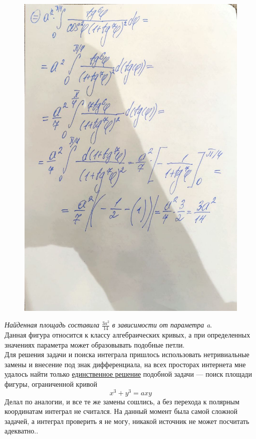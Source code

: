 \documentclass[a4paper,12pt]{article}
\begin{document}
\begin{figure}[H]
    \centering
    \includegraphics[width=0.75\linewidth]{../img/4_2.jpg}
    \caption{}
    \label{fig:part1}
\end{figure}

\emph{Найденная площадь составила} \( \frac{3a^2}{14} \) \emph{в зависимости от параметра a}.\\
Данная фигура относится к классу алгебраических кривых, а при определенных
значениях параметра может образовывать подобные петли.\\
Для решения задачи и поиска интеграла пришлось использовать нетривиальные
замены и внесение под знак дифференциала, на всех просторах интернета
мне удалось найти только \href{https://primat.org/publ/reshennye_zadachi/vychislenie_ploskoj_figury/43-1-0-775}{единственное решение} подобной задачи --- поиск
площади фигуры, ограниченной кривой \[x^3 + y^3 = axy\]
Делал по аналогии, и все те же замены сошлись, а без перехода к полярным
координатам интеграл не считался. На данный момент была самой сложной задачей, а интеграл проверить я не могу, никакой источник не может посчитать адекватно..
\end{document}
